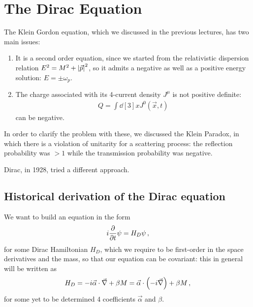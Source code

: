 \documentclass[main.tex]{subfiles}
\begin{document}
\section{The Dirac Equation}


The Klein Gordon equation, which we discussed in the previous lectures, has two main issues: 
\begin{enumerate}
  \item It is a second order equation, since we started from the relativistic dispersion relation \(E^2 = M^2 + \abs{\vec{p}}^2\), so it admits a negative as well as a positive energy solution: \(E = \pm \omega_{p}\). 
  \item The charge associated with its 4-current density \(J^{\mu }\) is not positive definite: 
  \begin{align}
  Q = \int \dd[3]{x} J^{0}(\vec{x}, t) 
  \,
  \end{align}
  can be negative. 
\end{enumerate}

In order to clarify the problem with these, we discussed the Klein Paradox, in which there is a violation of unitarity for a scattering process: the reflection probability was \(>1\) while the transmission probability was negative. 

Dirac, in 1928, tried a different approach. 

\subsection{Historical derivation of the Dirac equation}

We want to build an equation in the form 
%
\begin{align}
i \pdv{}{t} \psi  = H_D \psi 
\,,
\end{align}
%
for some Dirac Hamiltonian \(H_D\), which we require to be first-order in the space derivatives and the mass, so that our equation can be covariant: this in general will be written as 
%
\begin{align}
H_D = -i \vec{\alpha} \cdot \vec{\nabla} + \beta M = \vec{\alpha} \cdot \qty(-i \vec{\nabla}) + \beta M
\,,
\end{align}
%
for some yet to be determined 4 coefficients \(\vec{\alpha}\) and \(\beta \).
\end{document}
